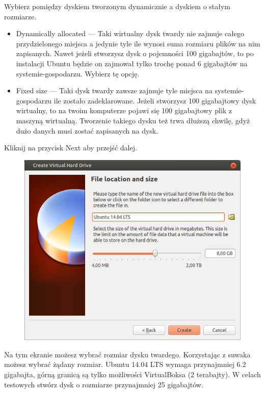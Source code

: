Wybierz pomiędzy dyskiem tworzonym dynamicznie a dyskiem o stałym rozmiarze.
\begin{itemize}
\item \textcolor{ubuntu_orange}{Dynamically allocated} --- Taki wirtualny dysk twardy nie zajmuje całego przydzielonego miejsca a jedynie tyle ile wynosi suma rozmiaru plików na nim zapisanych. Nawet jeżeli stworzysz dysk o pojemności 100 gigabajtów, to po instalacji Ubuntu będzie on zajmował tylko trochę ponad 6 gigabajtów na systemie-gospodarzu. Wybierz tę opcję.
\item \textcolor{ubuntu_orange}{Fixed size} --- Taki dysk twardy zawsze zajmuje tyle miejsca na systemie-gospodarzu ile zostało zadeklarowane. Jeżeli stworzysz 100 gigabajtowy dysk wirtualny, to na twoim komputerze pojawi się 100 gigabajtowy plik z maszyną wirtualną. Tworzenie takiego dysku też trwa dłuższą chwilę, gdyż dużo danych musi zostać zapisanych na dysk.
\end{itemize}
\begin{flushright}
Kliknij na przycisk \textcolor{ubuntu_orange}{Next} aby przejść dalej.
\end{flushright}

\begin{figure}
	\vspace{-10pt}
	\includegraphics[width=\linewidth]{images/virtualbox_wizard6.png}
\end{figure}

Na tym ekranie możesz wybrać rozmiar dysku twardego. Korzystając z suwaka możesz wybrać żądany rozmiar. Ubuntu 14.04 LTS wymaga przynajmniej 6.2 gigabajta, górną granicą są tylko możliwości VirtualBoksa (2 terabajty). W celach testowych stwórz dysk o rozmiarze przynajmniej 25 gigabajtów.

